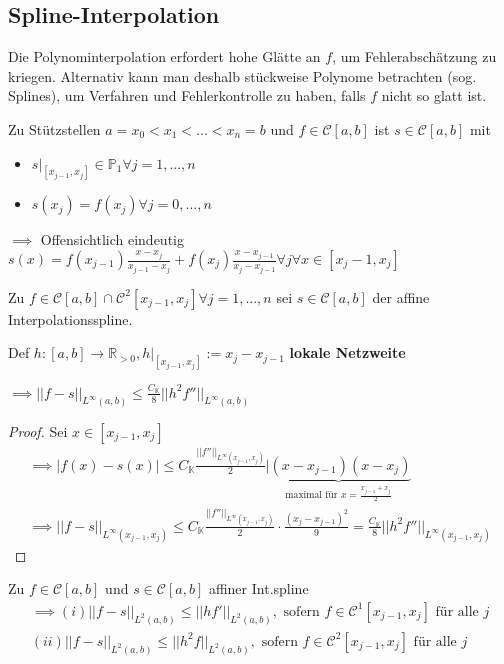 \subsection{Spline-Interpolation}

Die Polynominterpolation erfordert hohe Glätte an $f$, um Fehlerabschätzung zu kriegen. Alternativ kann man deshalb stückweise Polynome betrachten (sog. Splines), um Verfahren und Fehlerkontrolle zu haben, falls $f$ nicht so glatt ist.

\begin{example}
	Zu Stützstellen $a = x_0 < x_1 < ... < x_n = b$ und $f \in \mathcal{C}[a,b]$ ist $s \in \mathcal{C}[a,b]$ mit
	\begin{itemize}
		\item $s|_{[x_{j-1}, x_j]} \in \mathbb{P}_1 \forall j=1, ..., n$
		\item $s(x_j) = f(x_j) \forall j=0, ..., n$
	\end{itemize}
	
	$\implies$ Offensichtlich eindeutig $s(x) = f(x_{j-1}) \frac{x-x_j}{x_{j-1}-x_j} + f(x_j) \frac{x-x_{j-1}}{x_j-x_{j-1}} \forall j \forall x \in [x_j-1, x_j]$
\end{example}

\begin{lemma}
	Zu $f \in \mathcal{C}[a, b] \cap \mathcal{C}^2[x_{j-1}, x_j] \forall j=1, ..., n$ sei $s \in \mathcal{C}[a, b]$ der affine Interpolationsspline.
	
	Def $h:[a,b] \rightarrow \mathbb{R}_{>0}, h|_{[x_{j-1}, x_j]} := x_j - x_{j-1}$ \textbf{lokale Netzweite}
	
	$\implies ||f-s||_{L^\infty(a,b)} \leq \frac{C_{\mathbb{K}}}{8} ||h^2 f''||_{L^\infty(a,b)}$
\end{lemma}

\begin{proof}
	Sei $x \in [x_{j-1}, x_j]$
	\begin{align*}
		\implies |f(x) - s(x)| \leq C_{\mathbb{K}} \frac{||f''||_{L^\infty(x_{j-1}, x_j)}}{2} \underbrace{|(x-x_{j-1})(x-x_j)}_{\text{maximal für }x = \frac{x_{j-1} + x_j}{2}}\\
		\implies ||f-s||_{L^\infty(x_{j-1}, x_j)} \leq C_{\mathbb{K}} \frac{||f''||_{L^\infty(x_{j-1}, x_j)}}{2} \cdot \frac{(x_j - x_{j-1})^2}{9} = \frac{C_{\mathbb{K}}}{8} ||h^2 f''||_{L^\infty(x_{j-1}, x_j)}
	\end{align*}
\end{proof}

\begin{lemma}
	Zu $f \in \mathcal{C}[a, b]$ und $s \in \mathcal{C}[a, b]$ affiner Int.spline
	\begin{align*}
		\implies (i) ||f-s||_{L^2(a,b)} \leq ||h f'||_{L^2(a,b)}, \text{ sofern } f \in \mathcal{C}^1[x_{j-1}, x_j] \text{ für alle } j\\
		(ii) ||f-s||_{L^2(a,b)} \leq ||h^2f||_{L^2(a,b)}, \text{ sofern } f \in \mathcal{C}^2[x_{j-1}, x_j] \text{ für alle } j
	\end{align*}
\end{lemma}

